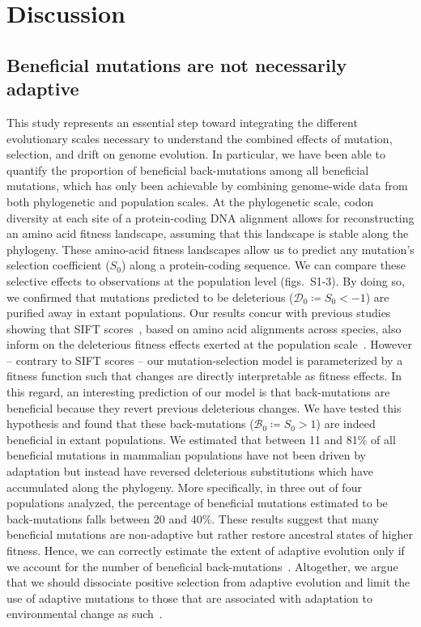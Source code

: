 \documentclass[12pt]{article}
\newcommand{\Sphy}{S_{0}}
\newcommand{\SphyDel}{\mathcal{D}_0}
\newcommand{\SphyBen}{\mathcal{B}_0}
\begin{document}
\section*{Discussion}
\subsection*{Beneficial mutations are not necessarily adaptive}

This study represents an essential step toward integrating the different evolutionary scales necessary to understand the combined effects of mutation, selection, and drift on genome evolution.
In particular, we have been able to quantify the proportion of beneficial back-mutations among all beneficial mutations, which has only been achievable by combining genome-wide data from both phylogenetic and population scales.
At the phylogenetic scale, codon diversity at each site of a protein-coding DNA alignment allows for reconstructing an amino acid fitness landscape, assuming that this landscape is stable along the phylogeny.
These amino-acid fitness landscapes allow us to predict any mutation’s selection coefficient ($\Sphy$) along a protein-coding sequence.
We can compare these selective effects to observations at the population level (figs.~S1-3).
By doing so, we confirmed that mutations predicted to be deleterious ($\SphyDel \coloneqq \Sphy < -1$) are purified away in extant populations.
Our results concur with previous studies showing that SIFT scores~\cite{ng_sift_2003, vaser_sift_2016}, based on amino acid alignments across species, also inform on the deleterious fitness effects exerted at the population scale~\cite{chen_hunting_2021}.
However – contrary to SIFT scores – our mutation-selection model is parameterized by a fitness function such that changes are directly interpretable as fitness effects.
In this regard, an interesting prediction of our model is that back-mutations are beneficial because they revert previous deleterious changes.
We have tested this hypothesis and found that these back-mutations ($\SphyBen \coloneqq \Sphy > 1 $) are indeed beneficial in extant populations.
We estimated that between 11 and 81\% of all beneficial mutations in mammalian populations have not been driven by adaptation but instead have reversed deleterious substitutions which have accumulated along the phylogeny.
More specifically, in three out of four populations analyzed, the percentage of beneficial mutations estimated to be back-mutations falls between 20 and 40\%.
These results suggest that many beneficial mutations are non-adaptive but rather restore ancestral states of higher fitness.
Hence, we can correctly estimate the extent of adaptive evolution only if we account for the number of beneficial back-mutations~\cite{keightley_what_2010, rice_evolutionarily_2015}.
Altogether, we argue that we should dissociate positive selection from adaptive evolution and limit the use of adaptive mutations to those that are associated with adaptation to environmental change as such~\cite{charlesworth_other_2007, mustonen_fitness_2009}.
\end{document}
